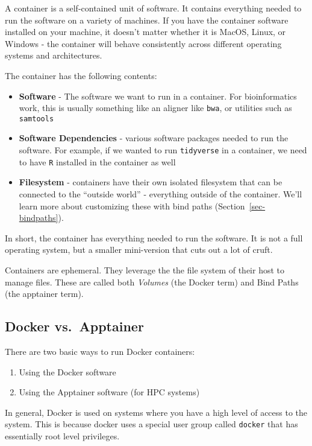 \documentclass[
  letterpaper,
  DIV=11,
  numbers=noendperiod]{scrreprt}
\providecommand{\tightlist}{%
  \setlength{\itemsep}{0pt}\setlength{\parskip}{0pt}}
\begin{document}
A container is a self-contained unit of software. It contains everything
needed to run the software on a variety of machines. If you have the
container software installed on your machine, it doesn't matter whether
it is MacOS, Linux, or Windows - the container will behave consistently
across different operating systems and architectures.

The container has the following contents:

\begin{itemize}
\tightlist
\item
  \textbf{Software} - The software we want to run in a container. For
  bioinformatics work, this is usually something like an aligner like
  \texttt{bwa}, or utilities such as \texttt{samtools}
\item
  \textbf{Software Dependencies} - various software packages needed to
  run the software. For example, if we wanted to run \texttt{tidyverse}
  in a container, we need to have \texttt{R} installed in the container
  as well
\item
  \textbf{Filesystem} - containers have their own isolated filesystem
  that can be connected to the ``outside world'' - everything outside of
  the container. We'll learn more about customizing these with bind
  paths (Section~\ref{sec-bindpaths}).
\end{itemize}

In short, the container has everything needed to run the software. It is
not a full operating system, but a smaller mini-version that cuts out a
lot of cruft.

Containers are ephemeral. They leverage the the file system of their
host to manage files. These are called both \emph{Volumes} (the Docker
term) and Bind Paths (the apptainer term).

\subsection{Docker vs.~Apptainer}\label{docker-vs.-apptainer}

There are two basic ways to run Docker containers:

\begin{enumerate}
\def\labelenumi{\arabic{enumi}.}
\tightlist
\item
  Using the Docker software
\item
  Using the Apptainer software (for HPC systems)
\end{enumerate}

In general, Docker is used on systems where you have a high level of
access to the system. This is because docker uses a special user group
called \texttt{docker} that has essentially root level privileges.
\end{document}
